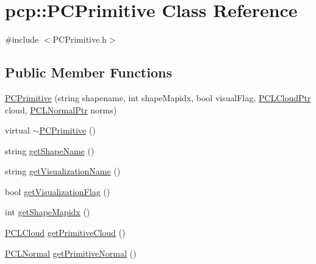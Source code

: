 \hypertarget{classpcp_1_1PCPrimitive}{\section{pcp\-:\-:P\-C\-Primitive Class Reference}
\label{classpcp_1_1PCPrimitive}
}


{\ttfamily \#include $<$P\-C\-Primitive.\-h$>$}

\subsection*{Public Member Functions}
\begin{DoxyCompactItemize}
\item 
\hyperlink{classpcp_1_1PCPrimitive_a00c270f938ac1f76c1252422e1f1424f}{P\-C\-Primitive} (string shapename, int shape\-Mapidx, bool visual\-Flag, \hyperlink{PCPrimitive_8h_aa14a240c8d999c4f56133c0f70e88783}{P\-C\-L\-Cloud\-Ptr} cloud, \hyperlink{PCPrimitive_8h_a1bc38ce8b0c26e5f2d28fae9f3e3ea97}{P\-C\-L\-Normal\-Ptr} norms)
\item 
virtual \hyperlink{classpcp_1_1PCPrimitive_a3a4da7e50a67144bc1b5b4dfd376b72e}{$\sim$\-P\-C\-Primitive} ()
\item 
string \hyperlink{classpcp_1_1PCPrimitive_a9f507218fd4c442d0daa4938e2e71c10}{get\-Shape\-Name} ()
\item 
string \hyperlink{classpcp_1_1PCPrimitive_ae6a97bc88b8cc7e83476413c73e01aeb}{get\-Visualization\-Name} ()
\item 
bool \hyperlink{classpcp_1_1PCPrimitive_ad92a83f976c6aac8125c7c8997633f21}{get\-Visualization\-Flag} ()
\item 
int \hyperlink{classpcp_1_1PCPrimitive_a1251deb8c39370d0ed5e7d2c7290063f}{get\-Shape\-Mapidx} ()
\item 
\hyperlink{PCPrimitive_8h_a02a7c0cdfcd324f1b5b87ce549fdbe10}{P\-C\-L\-Cloud} \hyperlink{classpcp_1_1PCPrimitive_ac774df2f9bb393e9a1491da1b0131d4f}{get\-Primitive\-Cloud} ()
\item 
\hyperlink{PCPrimitive_8h_abe81b5e6ffcc0ceb1b95b0489419027d}{P\-C\-L\-Normal} \hyperlink{classpcp_1_1PCPrimitive_aafdd30869b5e09e394d70efebe5eac2a}{get\-Primitive\-Normal} ()
\end{DoxyCompactItemize}
